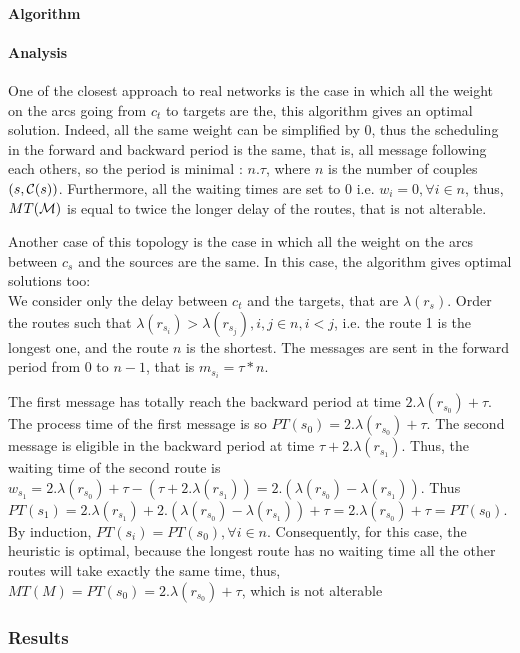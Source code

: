 \documentclass[a4paper,10pt]{article}
\begin{document}
	\paragraph{Algorithm}
	\paragraph{Analysis}
	
One of the closest approach to real networks is the case in which all the weight on the arcs going from $c_t$ to targets are the, this algorithm gives an optimal solution. Indeed, all the same weight can be simplified by 0, thus the scheduling in the forward and backward period is the same, that is, all message following each others, so the period is minimal : $n.\tau$, where $n$ is the number of couples $(s,{\cal C}(s))$. Furthermore, all the waiting times are set to 0 i.e. $w_i = 0,\forall i \in n$, thus, $MT({\cal M})$ is equal to twice the longer delay of the routes, that is not alterable.

Another case of this topology is the case in which all the weight on the arcs between $c_s$ and the sources are the same.
In this case, the algorithm gives optimal solutions too:\\

We consider only the delay between $c_t$ and the targets, that are $\lambda(r_{s})$. Order the routes such that $\lambda(r_{s_i}) > \lambda(r_{s_j}), i,j \in n, i<j$, i.e. the route 1 is the longest one, and the route $n$ is the shortest.
The messages are sent in the forward period from 0 to $n-1$, that is $m_{s_i} = \tau * n$.

The first message has totally reach the backward period at time $2.\lambda(r_{s_0})+\tau$. The process time of the first message is so $PT(s_0) = 2.\lambda(r_{s_0}) + \tau$.
The second message is eligible in the backward period at time $\tau + 2.\lambda(r_{s_1})$. Thus, the waiting time of the second route is $w_{s_1} = 2.\lambda(r_{s_0})+\tau - (\tau + 2.\lambda(r_{s_1})) = 2.(\lambda(r_{s_0}) - \lambda(r_{s_1}))$. Thus $PT(s_1) = 2.\lambda(r_{s_1}) + 2.(\lambda(r_{s_0}) - \lambda(r_{s_1})) +\tau = 2.\lambda(r_{s_0}) + \tau = PT(s_0)$.
By induction, $PT(s_i) = PT(s_0), \forall i \in n$. 
Consequently, for this case, the heuristic is optimal, because the longest route has no waiting time all the other routes will take exactly the same time, thus, $MT(M) = PT(s_0) = 2.\lambda(r_{s_0}) + \tau$, which is not alterable

     \subsubsection{Results}
\end{document}
